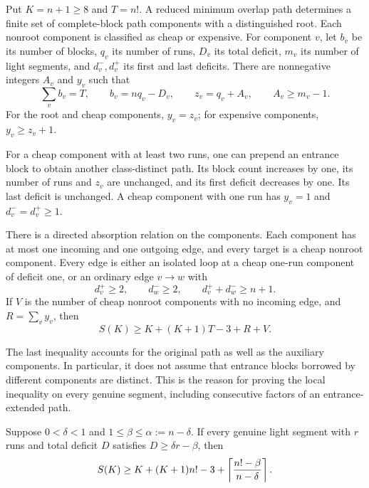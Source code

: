 \begin{lemma}\label{lem:forest-data}
Put $K=n+1\ge8$ and $T=n!$. A reduced minimum overlap path determines a finite
set of complete-block path components with a distinguished root. Each
nonroot component is classified as cheap or expensive. For component
$v$, let $b_v$ be its number of blocks, $q_v$ its number of runs,
$D_v$ its total deficit, $m_v$ its number of light segments, and
$d_v^-,d_v^+$ its first and last deficits. There are nonnegative
integers $A_v$ and $y_v$ such that
\[
 \sum_v b_v=T,\qquad b_v=nq_v-D_v,\qquad
 z_v=q_v+A_v,\qquad A_v\ge m_v-1.
\]
For the root and cheap components, $y_v=z_v$; for expensive components,
$y_v\ge z_v+1$.

For a cheap component with at least two runs, one can prepend an
entrance block to obtain another class-distinct path. Its block count
increases by one, its number of runs and $z_v$ are unchanged, and its
first deficit decreases by one. Its last deficit is unchanged.
A cheap component with one run has $y_v=1$ and
$d_v^-=d_v^+\ge1$.

There is a directed absorption relation on the components. Each component
has at most one incoming and one outgoing edge, and every target is a
cheap nonroot component. Every edge is either an isolated loop at a cheap
one-run component of deficit one, or an ordinary edge $v\to w$ with
\[
 d_v^+\ge2,\qquad d_w^-\ge2,\qquad d_v^++d_w^-\ge n+1.
\]
If $V$ is the number of cheap nonroot components with no incoming edge,
and $R=\sum_v y_v$, then
\begin{equation}\label{eq:residual}
 S(K)\ge K+(K+1)T-3+R+V.
\end{equation}
\end{lemma}

The last inequality accounts for the original path as well as the
auxiliary components. In particular, it does not assume that entrance
blocks borrowed by different components are distinct. This is the reason
for proving the local inequality on every genuine segment, including
consecutive factors of an entrance-extended path.

\begin{theorem}\label{thm:forest}
Suppose $0<\delta<1$ and $1\le\beta\le\alpha:=n-\delta$.
If every genuine light segment with $r$ runs and total deficit $D$
satisfies $D\ge\delta r-\beta$, then
\[
 S(K)\ge K+(K+1)n!-3+
 \left\lceil \frac{n!-\beta}{n-\delta}\right\rceil.
\]
\end{theorem}

